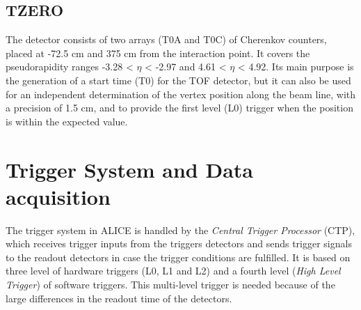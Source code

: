\subsection*{TZERO}
The detector consists of two arrays (T0A and T0C) of Cherenkov counters, placed at -72.5 cm and 375 cm from the interaction point. It covers the pseudorapidity ranges -3.28 < $\eta$ < -2.97 and 4.61 < $\eta$ < 4.92. Its main purpose is the generation of a start time (T0) for the TOF detector, but it can also be used for an independent determination of the vertex position along the beam line, with a precision of 1.5 cm, and to provide the first level (L0) trigger when the position is within the expected value.
\section{Trigger System and Data acquisition}
The trigger system in ALICE is handled by the \textit{Central Trigger Processor} (CTP), which receives trigger inputs from the triggers detectors and sends trigger signals to the readout detectors in case the trigger conditions are fulfilled. It is based on three level of hardware triggers (L0, L1 and L2) and a fourth level (\textit{High Level Trigger}) of software triggers. This multi-level trigger is needed because of the large differences in the readout time of the detectors.\\
